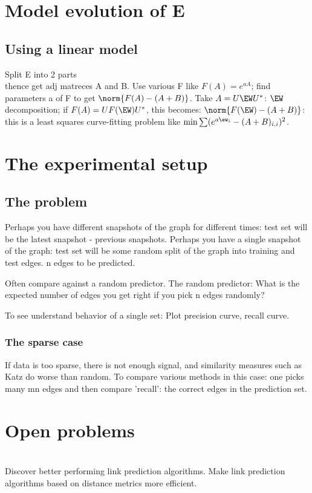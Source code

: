 \documentclass[oneside, article]{memoir}
\begin{document}
\section{Model evolution of E}
\subsection{Using a linear model}
Split E into 2 parts \\
thence get adj matreces A and B. Use various F like $F(A) = e^{aA}$; find parameters a of F to get $\norm{F(A) - (A+B)}$. Take $A = U\EW U^{*}$: $\EW$ decomposition; if $F(A) = UF(\EW)U^{*}$, this becomes: $\norm{F(\EW) - (A+B)}$: this is a least squares curve-fitting problem like $\min \sum (e^{a\ew_{i}} - (A+B)_{i,i})^{2}$.

\section{The experimental setup}
\subsection{The problem}
Perhaps you have different snapshots of the graph for different times: test set will be the latest snapshot - previous snapshots. Perhaps you have a single snapshot of the graph: test set will be some random split of the graph into training and test edges. n edges to be predicted.

Often compare against a random predictor. The random predictor: What is the expected number of edges you get right if you pick n edges randomly?

To see understand behavior of a single set: Plot precision curve, recall curve.

\subsubsection{The sparse case}
If data is too sparse, there is not enough signal, and similarity measures such as Katz do worse than random. To compare various methods in this case: one picks many mn edges and then compare 'recall': the correct edges in the prediction set.

\section{Open problems}
\oprob \\
Discover better performing link prediction algorithms. Make link prediction algorithms based on distance metrics more efficient.
\end{document}
